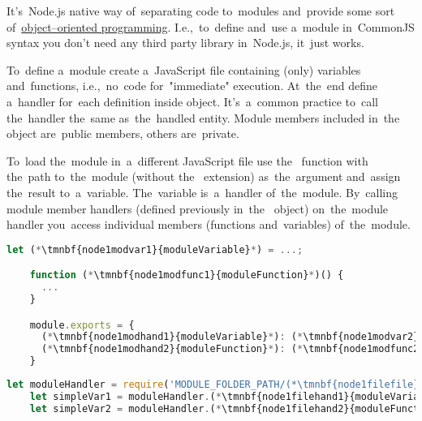 \label{nodejscommonjs}
It's~Node.js native way of~separating code to~modules and~provide some sort of~\hyperref[objectorientedprogramming]{object--oriented programming}.
I.e.,~to~define and~use a~module in~CommonJS syntax you don't need any third party library in~Node.js, it~just works.

To~define a~module create a~JavaScript file containing (only) variables and~functions, i.e.,~no~code for~"immediate" execution.
At~the~end define a~handler for~each definition inside  object.
It's~a~common practice to~call the~handler the~same as~the~handled entity.
Module members included in~the~ object are~public members, others are~private.

To~load the~module in~a~different JavaScript file use the~ function with the~path to~the~module (without the~ extension) as~the~argument and~assign the~result to~a~variable.
The~variable is~a~handler of~the~module.
By~calling module member handlers (defined previously in~the~ object) on~the~module handler you~access individual members (functions and~variables) of~the~module.

\emtwen
\begin{lstlisting}[language=JavaScript, title={Module file \mbit{\tmnbf{node1modfile}{moduleFile}.js}}]
    let (*\tmnbf{node1modvar1}{moduleVariable}*) = ...;

    function (*\tmnbf{node1modfunc1}{moduleFunction}*)() {
      ...
    }

    module.exports = {
      (*\tmnbf{node1modhand1}{moduleVariable}*): (*\tmnbf{node1modvar2}{moduleVariable}*),
      (*\tmnbf{node1modhand2}{moduleFunction}*): (*\tmnbf{node1modfunc2}{moduleFunction}*)
    }
\end{lstlisting}
\begin{lstlisting}[language=JavaScript, title={JavaScript executable file using the~module}]
    let moduleHandler = require('MODULE_FOLDER_PATH/(*\tmnbf{node1filefile}{moduleFile}[ForestGreen]*)');
    let simpleVar1 = moduleHandler.(*\tmnbf{node1filehand1}{moduleVariable}*); // Using module variable
    let simpleVar2 = moduleHandler.(*\tmnbf{node1filehand2}{moduleFunction}*)(); // Using module function
\end{lstlisting}
\newpage

